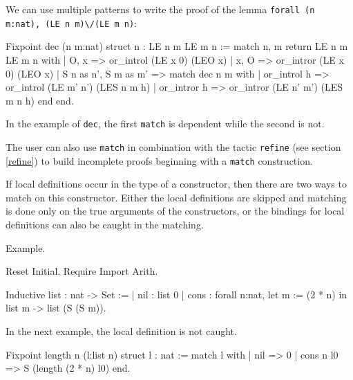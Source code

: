 We can use multiple patterns to write  the proof of the lemma
 \texttt{forall (n m:nat), (LE n m)}\verb=\/=\texttt{(LE m n)}:

\begin{coq_example}
Fixpoint dec (n m:nat) {struct n} : LE n m \/ LE m n :=
  match n, m return LE n m \/ LE m n with
  | O, x => or_introl (LE x 0) (LEO x)
  | x, O => or_intror (LE x 0) (LEO x)
  | S n as n', S m as m' =>
      match dec n m with
      | or_introl h => or_introl (LE m' n') (LES n m h)
      | or_intror h => or_intror (LE n' m') (LES m n h)
      end
  end.
\end{coq_example}
In the example of \texttt{dec},
the first \texttt{match} is dependent while 
the second is not.


The user can also use \texttt{match} in combination with the tactic
\texttt{refine} (see section \ref{refine}) to build incomplete proofs
beginning with a \texttt{match} construction.


If local definitions occur in the type of a constructor, then there
are two ways to match on this constructor. Either the local
definitions are skipped and matching is done only on the true arguments
of the constructors, or the bindings for local definitions can also
be caught in the matching.

Example.

\begin{coq_eval}
Reset Initial.
Require Import Arith.
\end{coq_eval}

\begin{coq_example*}
Inductive list : nat -> Set :=
  | nil : list 0
  | cons : forall n:nat, let m := (2 * n) in list m -> list (S (S m)).
\end{coq_example*}

In the next example, the local definition is not caught.

\begin{coq_example}
Fixpoint length n (l:list n) {struct l} : nat :=
  match l with
  | nil => 0
  | cons n l0 => S (length (2 * n) l0)
  end.
\end{coq_example}

